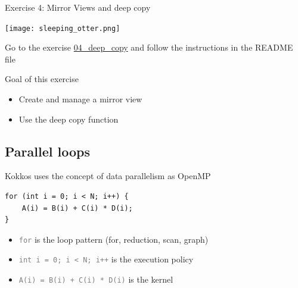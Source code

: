 \documentclass[aspectratio=169]{beamer}
\begin{document}

\begin{frame}{Exercise 4: Mirror Views and deep copy}
    \begin{center}
        \texttt{[image: sleeping\_otter.png]}
    \end{center}

    Go to the exercise \href{https://github.com/CExA-project/cexa-kokkos-tutorials/tree/main/exercises/04_deep_copy}{04\_deep\_copy} and follow the instructions in the README file

    \begin{block}{Goal of this exercise}
        \begin{itemize}
            \item Create and manage a mirror view
            \item Use the deep copy function
        \end{itemize}
    \end{block}
\end{frame}


\subsection{Parallel loops}


\begin{frame}[fragile]{Kokkos uses the concept of data parallelism as OpenMP}
    \begin{verbatim}
for (int i = 0; i < N; i++) {
    A(i) = B(i) + C(i) * D(i);
}
    \end{verbatim}
    \begin{itemize}
        \item \textcolor{gray}{\texttt{for}} is the loop pattern (for, reduction, scan, graph)
        \item \textcolor{gray}{\texttt{int i = 0; i < N; i++}} is the execution policy
        \item \textcolor{gray}{\texttt{A(i) = B(i) + C(i) * D(i)}} is the kernel
    \end{itemize}
\end{frame}

\end{document}
